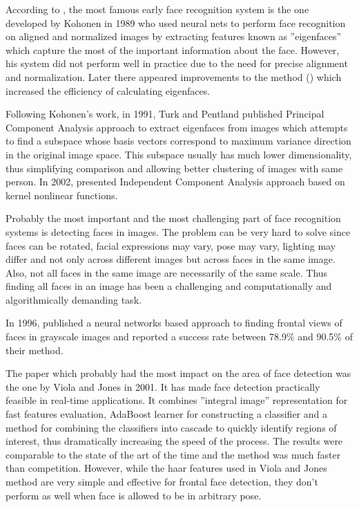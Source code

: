 \documentclass[11pt, draftclsnofoot, onecolumn]{IEEEtran}
\begin{document}
According to \cite{MIT2000}, the most famous early face recognition system is the one developed by Kohonen in 1989 who used neural nets to perform face recognition on aligned and normalized images by extracting features known as ''eigenfaces'' which capture the most of the important information about the face. However, his system did not perform well in practice due to the need for precise alignment and normalization. Later there appeared improvements to the method (\cite{IEEE1990}) which increased the efficiency of calculating eigenfaces.

Following Kohonen's work, in 1991, Turk and Pentland \cite{MIT1991} published Principal Component Analysis approach to extract eigenfaces from images which attempts to find a subspace whose basis vectors correspond to maximum variance direction in the original image space. This subspace usually has much lower dimensionality, thus simplifying comparison and allowing better clustering of images with same person. In 2002, \cite{JMLR2002} presented Independent Component Analysis approach based on kernel nonlinear functions.

Probably the most important and the most challenging part of face recognition systems is detecting faces in images. The problem can be very hard to solve since faces can be rotated, facial expressions may vary, pose may vary, lighting may differ and not only across different images but across faces in the same image. Also, not all faces in the same image are necessarily of the same scale. Thus finding all faces in an image has been a challenging and computationally and algorithmically demanding task.

In 1996, \cite{CVPR1996} published a neural networks based approach to finding frontal views of faces in grayscale images and reported a success rate between 78.9\% and 90.5\% of their method.

The paper which probably had the most impact on the area of face detection was the one by Viola and Jones \cite{IWSCTV2001} in 2001. It has made face detection practically feasible in real-time applications. It combines ''integral image'' representation for fast features evaluation, AdaBoost learner for constructing a classifier and a method for combining the classifiers into cascade to quickly identify regions of interest, thus dramatically increasing the speed of the process. The results were comparable to the state of the art of the time and the method was much faster than competition. However, while the haar features used in Viola and Jones method are very simple and effective for frontal face detection, they don't perform as well when face is allowed to be in arbitrary pose. 
\end{document}
